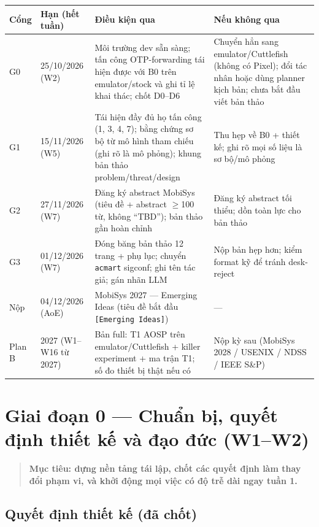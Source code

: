\documentclass[11pt,a4paper]{article}
\newcommand{\code}[1]{\texttt{\small #1}}
\newenvironment{phasebox}
  {\begin{quote}\color{shblue}\bfseries}
  {\end{quote}}
\begin{document}
\begin{longtable}{@{}p{1.3cm}p{2.4cm}p{5.9cm}p{5.0cm}@{}}
\toprule
\textbf{Cổng} & \textbf{Hạn (hết tuần)} & \textbf{Điều kiện qua} & \textbf{Nếu không qua} \\
\midrule
\endhead
G0 & 25/10/2026 (W2) &
Môi trường dev sẵn sàng; tấn công OTP-forwarding tái hiện được với B0 trên emulator/stock và ghi tỉ lệ khai thác; chốt D0--D6 &
Chuyển hẳn sang emulator/Cuttlefish (không có Pixel); đổi tác nhân hoặc dùng planner kịch bản; chưa bắt đầu viết bản thảo \\
\addlinespace
G1 & 15/11/2026 (W5) &
Tái hiện đầy đủ họ tấn công (1, 3, 4, 7); bằng chứng sơ bộ từ mô hình tham chiếu (ghi rõ là mô phỏng); khung bản thảo problem/threat/design &
Thu hẹp về B0 + thiết kế; ghi rõ mọi số liệu là sơ bộ/mô phỏng \\
\addlinespace
G2 & 27/11/2026 (W7) &
Đăng ký abstract MobiSys (tiêu đề + abstract $\ge$100 từ, không ``TBD''); bản thảo gần hoàn chỉnh &
Đăng ký abstract tối thiểu; dồn toàn lực cho bản thảo \\
\addlinespace
G3 & 01/12/2026 (W7) &
Đóng băng bản thảo 12 trang + phụ lục; chuyển \code{acmart} sigconf; ghi tên tác giả; gán nhãn LLM &
Nộp bản hẹp hơn; kiểm format kỹ để tránh desk-reject \\
\addlinespace
Nộp & 04/12/2026 (AoE) &
MobiSys 2027 --- Emerging Ideas (tiêu đề bắt đầu \code{[Emerging Ideas]}) & --- \\
\addlinespace
Plan B & 2027 (W1--W16 từ 2027) &
Bản full: T1 AOSP trên emulator/Cuttlefish + killer experiment + ma trận T1; số đo thiết bị thật nếu có &
Nộp kỳ sau (MobiSys 2028 / USENIX / NDSS / IEEE S\&P) \\
\bottomrule
\end{longtable}

\section{Giai đoạn 0 --- Chuẩn bị, quyết định thiết kế và đạo đức (W1--W2)}

\begin{phasebox}Mục tiêu: dựng nền tảng tái lập, chốt các quyết định làm thay đổi phạm vi, và khởi động mọi việc có độ trễ dài ngay tuần 1.\end{phasebox}

\subsection{Quyết định thiết kế (đã chốt)}
\end{document}
